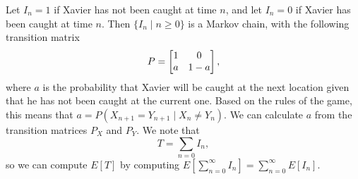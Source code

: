 \documentclass{homework}
\begin{document}
	\question 
	\begin{alphaparts}
		\questionpart
		Let $I_n = 1$ if Xavier has not been caught at time $n$, and let $I_n = 0$ if Xavier has been caught at time $n$. Then $\{I_n \mid n \ge 0\}$ is a Markov chain, with the following transition matrix
		\begin{equation*}
			P = \left[\begin{matrix}1 & 0 \\ a & 1-a\end{matrix}\right],
		\end{equation*}
		where $a$ is the probability that Xavier will be caught at the next location given that he has not been caught at the current one. Based on the rules of the game, this means that $a = P(X_{n+1} = Y_{n+1} \mid X_n \ne Y_n)$. We can calculate $a$ from the transition matrices $P_X$ and $P_Y$. We note that
		\begin{equation*}
			T = \sum_{n=0}I_n,
		\end{equation*}
		so we can compute $E[T]$ by computing $E\left[\sum_{n=0}^\infty I_n\right] = \sum_{n=0}^\infty E[I_n]$.
		

\end{alphaparts}
\end{document}
